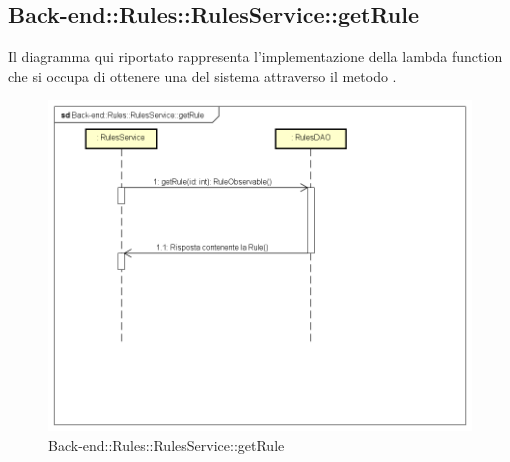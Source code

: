 \subsection{Back-end::Rules::RulesService::getRule}
Il diagramma qui riportato rappresenta l'implementazione della lambda function che si occupa di ottenere una  del sistema attraverso il metodo .
\begin{figure}[h] \centering \includegraphics[width=\textwidth,height=\textheight,keepaspectratio]{images/diagrams/back-end/Ufficial_Backend/Back-endRulesRulesServicegetRule.png} 	\caption{Back-end::Rules::RulesService::getRule}
\end{figure}
\newpage


